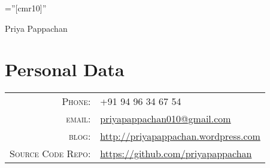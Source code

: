 \documentclass[a4paper,10pt]{article}
\begin{document}

\pagestyle{empty} %

\font\fb=''[cmr10]'' %

\par{\centering
		{\Huge Priya Pappachan
	}\bigskip\par}

\section{Personal Data}

\begin{tabular}{rl}
  
   
    \textsc{Phone:}     & +91 94 96 34 67 54\\
    \textsc{email:}     & \href{mailto:priyapappachan010@gmail.com}{priyapappachan010@gmail.com}\\
     \textsc{blog:}     & \href{http://priyapappachan.wordpress.com}{http://priyapappachan.wordpress.com}\\
     \textsc{Source Code Repo:}  & \href{https://github.com/priyapappachan}{https://github.com/priyapappachan}\\
    
\end{tabular}

\end{document}
